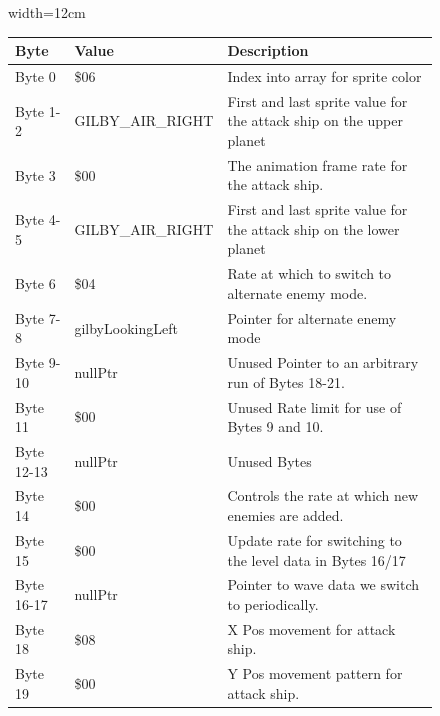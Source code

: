 \begin{figure}[H]
  {
  \setlength{\tabcolsep}{3.0pt}
  \setlength\cmidrulewidth{\heavyrulewidth} %
  \begin{adjustbox}{width=12cm}

\begin{tabular}{lll}
\toprule
 Byte       & Value                    & Description                                                         \\
\midrule
 Byte 0     & \$06                      & Index into array for sprite color                                   \\
 Byte 1-2   & GILBY\_AIR\_RIGHT     & First and last sprite value for the attack ship on the upper planet \\
 Byte 3     & \$00                      & The animation frame rate for the attack ship.                       \\
 Byte 4-5   & GILBY\_AIR\_RIGHT     & First and last sprite value for the attack ship on the lower planet \\
 Byte 6     & \$04                      & Rate at which to switch to alternate enemy mode.                    \\
 Byte 7-8   & gilbyLookingLeft         & Pointer for alternate enemy mode                                    \\
 Byte 9-10  & nullPtr                  & Unused Pointer to an arbitrary run of Bytes 18-21.                  \\
 Byte 11    & \$00                      & Unused Rate limit for use of Bytes 9 and 10.                        \\
 Byte 12-13 & nullPtr                  & Unused Bytes                                                        \\
 Byte 14    & \$00                      & Controls the rate at which new enemies are added.                   \\
 Byte 15    & \$00                      & Update rate for switching to the level data in Bytes 16/17          \\
 Byte 16-17 & nullPtr                  & Pointer to wave data we switch to periodically.                     \\
 Byte 18    & \$08                      & X Pos movement for attack ship.                                     \\
 Byte 19    & \$00                      & Y Pos movement pattern for attack ship.                             \\

\end{tabular}
\end{adjustbox}}
\end{figure}
